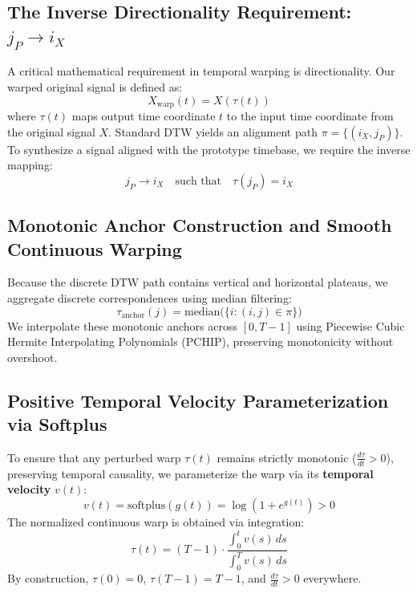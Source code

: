 \documentclass[11pt,a4paper]{report}
\begin{document}
\subsection{The Inverse Directionality Requirement: $j_P \rightarrow i_X$}
A critical mathematical requirement in temporal warping is directionality. Our warped original signal is defined as:
\begin{equation}
    X_{\text{warp}}(t) = X(\tau(t))
\end{equation}
where $\tau(t)$ maps output time coordinate $t$ to the input time coordinate from the original signal $X$. Standard DTW yields an alignment path $\pi = \{(i_X, j_P)\}$. To synthesize a signal aligned with the prototype timebase, we require the inverse mapping:
\begin{equation}
    j_P \longrightarrow i_X \quad \text{such that} \quad \tau(j_P) = i_X
\end{equation}

\subsection{Monotonic Anchor Construction and Smooth Continuous Warping}
Because the discrete DTW path contains vertical and horizontal plateaus, we aggregate discrete correspondences using median filtering:
\begin{equation}
    \tau_{\text{anchor}}(j) = \text{median}\Big(\{i : (i, j) \in \pi\}\Big)
\end{equation}
We interpolate these monotonic anchors across $[0, T-1]$ using Piecewise Cubic Hermite Interpolating Polynomials (PCHIP), preserving monotonicity without overshoot.

\subsection{Positive Temporal Velocity Parameterization via Softplus}
To ensure that any perturbed warp $\tau(t)$ remains strictly monotonic ($\frac{d\tau}{dt} > 0$), preserving temporal causality, we parameterize the warp via its \textbf{temporal velocity} $v(t)$:
\begin{equation}
    v(t) = \text{softplus}(g(t)) = \log(1 + e^{g(t)}) > 0
\end{equation}
The normalized continuous warp is obtained via integration:
\begin{equation}
    \tau(t) = (T - 1) \cdot \frac{\int_0^t v(s) \, ds}{\int_0^T v(s) \, ds}
\end{equation}
By construction, $\tau(0) = 0$, $\tau(T-1) = T-1$, and $\frac{d\tau}{dt} > 0$ everywhere.
\end{document}
